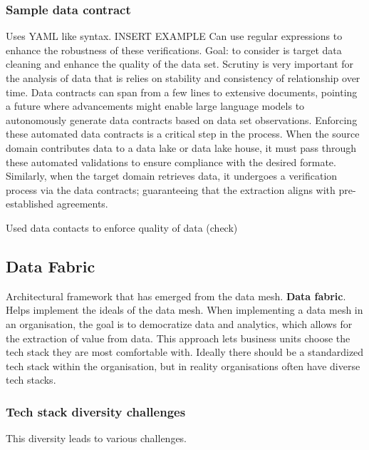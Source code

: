 \subsubsection{Sample data contract}
Uses YAML like syntax.
INSERT EXAMPLE
Can use regular expressions to enhance the robustness of these verifications.
Goal: to consider is target data cleaning and enhance the quality of the data set.
Scrutiny is very important for the analysis of data that is relies on stability and consistency of relationship over time.
Data contracts can span from a few lines to extensive documents, pointing a future where advancements might enable large language models to autonomously generate data contracts based on data set observations.
Enforcing these automated data contracts is a critical step in the process.
When the source domain contributes data to a data lake or data lake house, it must pass through these automated validations to ensure compliance with the desired formate.
Similarly, when the target domain retrieves data, it undergoes a verification process via the data contracts; guaranteeing that the extraction aligns with pre-established agreements.

Used data contacts to enforce quality of data (check)

\subsection{Data Fabric}
Architectural framework that has emerged from the data mesh. \textbf{Data fabric}.
Helps implement the ideals of the data mesh.
When implementing a data mesh in an organisation, the goal is to democratize data and analytics, which allows for the extraction of value from data.
This approach lets business units choose the tech stack they are most comfortable with.
Ideally there should be a standardized tech stack within the organisation, but in reality organisations often have diverse tech stacks.

\subsubsection{Tech stack diversity challenges}
This diversity leads to various challenges.

